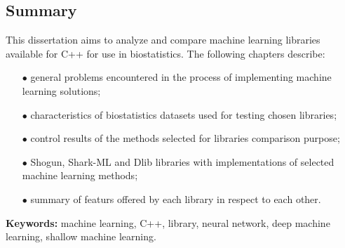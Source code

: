 
\subsection*{Summary}

	This dissertation aims to analyze and compare machine learning libraries available for C++ for use in biostatistics. The following chapters describe:

    \begin{itemize}
    	\item [$\bullet$] general problems encountered in the process of implementing machine learning solutions;
    	\item [$\bullet$] characteristics of biostatistics datasets used for testing chosen libraries;
    	\item [$\bullet$] control results of the methods selected for libraries comparison purpose;
    	\item [$\bullet$] Shogun, Shark-ML and Dlib libraries with implementations of selected machine learning methods;
    	\item [$\bullet$] summary of featurs offered by each library in respect to each other.
    \end{itemize}

\vspace{1cm}
\noindent\textbf{Keywords:} machine learning, C++, library, neural network, deep machine learning, shallow machine learning.

